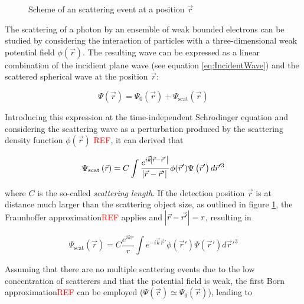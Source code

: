 \begin{figure}%
	\centering
	        \def\svgwidth{0.75\linewidth}
		
		\caption{Scheme of an scattering event at a position $\vec{r}$}
		\label{fig:FraunhoferScheme}
\end{figure}

The scattering of a photon by an ensemble of weak bounded electrons can be studied by considering the interaction of particles with a three-dimensional weak potential field $\phi(\vec{r})$. The resulting wave can be expressed as a linear combination of the incidient plane wave (see equation \ref{eq:IncidentWave}) and the scattered spherical wave at the position $\vec{r}$:

\begin{equation}
       \Psi\left( \vec{r} \right)= \Psi_0\left( \vec{r} \right) +  \Psi_{\text{scat}}\left( \vec{r} \right)
\end{equation}

Introducing this expression at the time-independent Schrodinger equation and considering the scattering wave as a perturbation produced by the scattering density function $\phi(\vec{r})$ \textcolor{red}{REF}, it can derived that

\begin{equation}
       \Psi_{\text{scat}}\left( \vec{r} \right)=C \int \frac{e^{ i \vec{k}\abs{\vec{r}-\vec{r}'} } } {\abs{\vec{r}-\vec{r}'}} \phi(\vec{r}')   \Psi\left( \vec{r}' \right) d\vec{r}'^3
\end{equation}

where $C$ is the so-called \emph{scattering length}. If the detection position $\vec{r}$ is at distance much larger than the scattering object size, as outlined in figure \ref{fig:FraunhoferScheme}, the Fraunhoffer approximation\textcolor{red}{REF} applies and $\abs{\vec{r}-\vec{r'}}=r$, resulting in

\begin{equation}
       \Psi_{\text{scat}}\left( \vec{r} \right)=C \frac{e^{i k r}}{r} \int e^{ -i \vec{k}\vec{r}' }  \phi(\vec{r}')   \Psi\left( \vec{r}' \right) d\vec{r}'^3
\end{equation}

Assuming that there are no multiple scattering events due to the low concentration of scatterers and that the potential field is weak, the first Born approximation\textcolor{red}{REF} can be employed ($ \Psi\left( \vec{r} \right) \simeq \Psi_0\left( \vec{r} \right)$), leading to

